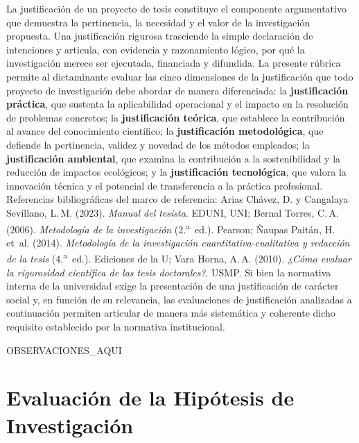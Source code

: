 \documentclass[12pt,a4paper]{report}
\begin{document}
La justificación de un proyecto de tesis constituye el componente argumentativo que demuestra la pertinencia, la necesidad y el valor de la investigación propuesta. Una justificación rigurosa trasciende la simple declaración de intenciones y articula, con evidencia y razonamiento lógico, por qué la investigación merece ser ejecutada, financiada y difundida. La presente rúbrica permite al dictaminante evaluar las cinco dimensiones de la justificación que todo proyecto de investigación debe abordar de manera diferenciada: la \textbf{justificación práctica}, que sustenta la aplicabilidad operacional y el impacto en la resolución de problemas concretos; la \textbf{justificación teórica}, que establece la contribución al avance del conocimiento científico; la \textbf{justificación metodológica}, que defiende la pertinencia, validez y novedad de los métodos empleados; la \textbf{justificación ambiental}, que examina la contribución a la sostenibilidad y la reducción de impactos ecológicos; y la \textbf{justificación tecnológica}, que valora la innovación técnica y el potencial de transferencia a la práctica profesional. Referencias bibliográficas del marco de referencia: Arias Chávez, D. y Cangalaya Sevillano, L.\,M. (2023). \textit{Manual del tesista}. EDUNI, UNI; Bernal Torres, C.\,A. (2006). \textit{Metodología de la investigación} (2.\textsuperscript{a}~ed.). Pearson; Ñaupas Paitán, H. et~al. (2014). \textit{Metodología de la investigación cuantitativa-cualitativa y redacción de la tesis} (4.\textsuperscript{a}~ed.). Ediciones de la U; Vara Horna, A.\,A. (2010). \textit{¿Cómo evaluar la rigurosidad científica de las tesis doctorales?}. USMP. Si bien la normativa interna de la universidad exige la presentación de una justificación de carácter social y, en función de su relevancia, las evaluaciones de justificación analizadas a continuación permiten articular de manera más sistemática y coherente dicho requisito establecido por la normativa institucional.


{{OBSERVACIONES_AQUI}}


\section{Evaluación de la Hipótesis de Investigación}
\end{document}
